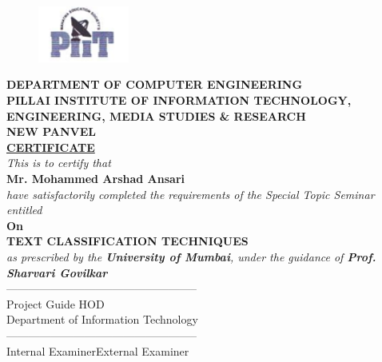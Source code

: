 \documentclass[12pt]{book}
\begin{document}
\begin{figure}[ht!]
    \centering
    \includegraphics[width=30mm]{piit.png}
\end{figure}
\begin{center}
    \fontsize{14}{30}\selectfont \textbf{DEPARTMENT OF COMPUTER ENGINEERING\\PILLAI INSTITUTE OF INFORMATION TECHNOLOGY,\\ENGINEERING, MEDIA STUDIES \& RESEARCH\\ NEW PANVEL}\\
    \fontsize{22}{30}\selectfont \textbf{\underline{CERTIFICATE}}\\
    \fontsize{14}{30}\selectfont \textit{This is to certify that}\\
    \fontsize{14}{30}\selectfont \textbf{Mr. Mohammed Arshad Ansari}\\
    \fontsize{14}{30}\selectfont \textit{have satisfactorily completed the requirements of the Special Topic Seminar entitled}\\
    \fontsize{14}{30}\selectfont \textbf{On}\\
    \fontsize{20}{30}\selectfont \textbf{TEXT CLASSIFICATION TECHNIQUES}\\
    \fontsize{14}{30}\selectfont \textit{as prescribed by the \textbf{University of Mumbai}, under the guidance of \textbf{Prof. Sharvari Govilkar}}\\
    \vspace{20mm}
    \noindent --------------------------\hfill--------------------------\\
    \noindent Project Guide \hfill HOD\\
    \noindent\hfill \fontsize{14}{20}\selectfont Department of Information Technology\\
    \vspace{20mm}
    \noindent --------------------------\hfill--------------------------\\
    \noindent Internal Examiner\hfill External Examiner\\



\end{center}
	
\end{document}
